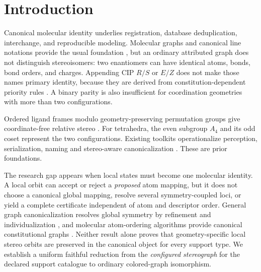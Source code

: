\documentclass[pdflatex,sn-mathphys-num,referee,lineno]{sn-jnl}
\theoremstyle{plain}
\theoremstyle{remark}
\theoremstyle{definition}
\begin{document}

\maketitle

\section{Introduction}
\label{sec:introduction}

Canonical molecular identity underlies registration, database deduplication,
interchange, and reproducible modeling.  Molecular graphs and canonical line
notations provide the usual foundation
\cite{bonchev1991,weininger1989unique,heller2015inchi,schneider2015canonical},
but an ordinary attributed graph does not distinguish stereoisomers: two
enantiomers can have identical atoms, bonds, bond orders, and charges.
Appending CIP \(R/S\) or \(E/Z\) does not make those names primary identity,
because they are derived from constitution-dependent priority rules
\cite{cahn1966chirality,hanson2018cip}.  A binary parity is also insufficient
for coordination geometries with more than two configurations.

Ordered ligand frames modulo geometry-preserving permutation groups give
coordinate-free relative stereo \cite{andersen2017stereo,papusha2026stereomolgraph}.
For tetrahedra, the even subgroup \(A_4\) and its odd coset represent the two
configurations. Existing toolkits operationalize perception, serialization,
naming and stereo-aware canonicalization
\cite{rdkit,nugmanov2019cgrtools,heller2015inchi,sobez2020molassembler}.
These are prior foundations.

The research gap appears when local states must become one molecular identity.
A local orbit can accept or reject a \emph{proposed} atom mapping, but it does
not choose a canonical global mapping, resolve several symmetry-coupled loci,
or yield a complete certificate independent of atom and descriptor order.
General graph canonicalization resolves global symmetry by refinement and
individualization \cite{weisfeiler1968reduction,mckay2014practical}, and
molecular atom-ordering algorithms provide canonical constitutional graphs
\cite{weininger1989unique,schneider2015canonical}.  Neither result alone proves
that geometry-specific local stereo orbits are preserved in the canonical
object for every support type. We establish a uniform faithful reduction
from the \emph{configured stereograph} for the declared support catalogue to
ordinary colored-graph isomorphism.
\end{document}
